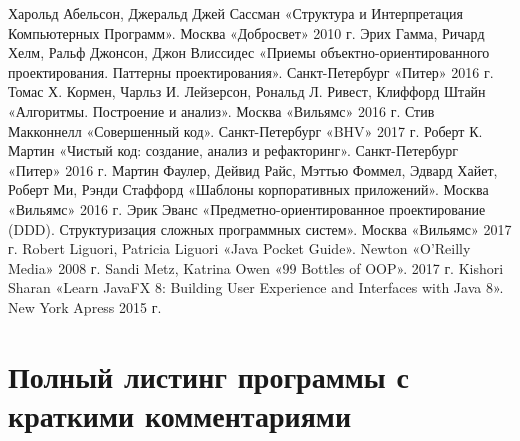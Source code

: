 \documentclass[russian,utf8,simple,hpadding=10mm,vpadding=20mm]{eskdtext}
\begin{document}
\renewcommand*\DTstylecomment{\rmfamily\color{black}\textsc}
\renewcommand*\DTstyle{\ttfamily\textcolor{black}}

\newpage
\begin{thebibliography}{99}
	Харольд Абельсон, Джеральд Джей Сассман «Структура и Интерпретация Компьютерных Программ». Москва «Добросвет» 2010 г.
	Эрих Гамма, Ричард Хелм, Ральф Джонсон, Джон Влиссидес «Приемы объектно-ориентированного проектирования. Паттерны проектирования». Санкт-Петербург «Питер» 2016 г.
	Томас Х. Кормен, Чарльз И. Лейзерсон, Рональд Л. Ривест, Клиффорд Штайн «Алгоритмы. Построение и анализ». Москва «Вильямс» 2016 г.
	Стив Макконнелл «Совершенный код». Санкт-Петербург «BHV» 2017 г.
	Роберт К. Мартин «Чистый код: создание, анализ и рефакторинг». Санкт-Петербург «Питер» 2016 г.
	Мартин Фаулер, Дейвид Райс, Мэттью Фоммел, Эдвард Хайет, Роберт Ми, Рэнди Стаффорд «Шаблоны корпоративных приложений». Москва «Вильямс» 2016 г.
	Эрик Эванс «Предметно-ориентированное проектирование (DDD). Структуризация сложных программных систем». Москва «Вильямс» 2017 г.
	Robert Liguori, Patricia Liguori «Java Pocket Guide». Newton «O'Reilly Media» 2008 г.
	Sandi Metz, Katrina Owen «99 Bottles of OOP». 2017 г.
 Kishori Sharan «Learn JavaFX 8: Building User Experience and Interfaces with Java 8». New York Apress 2015 г.
\end{thebibliography}

\newpage
\parindent=15mm
\linespread{1,5}
\section*{Полный листинг программы с краткими комментариями}
%
\end{document}
